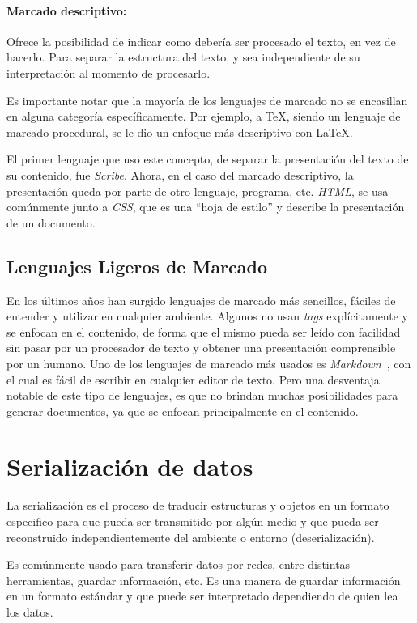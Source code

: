 \documentclass[12pt,letterpaper,titlepage,oneside,openright]{book}
\newcommand{\latex}{\LaTeX\xspace}
\newcommand{\tex}{\TeX\xspace}
\begin{document}
\paragraph{Marcado descriptivo:}

Ofrece la posibilidad de indicar como debería ser procesado el texto, en vez de hacerlo. Para separar la estructura del texto, y sea independiente de su interpretación al momento de procesarlo.

Es importante notar que la mayoría de los lenguajes de marcado no se encasillan en alguna categoría específicamente. Por ejemplo, a \tex, siendo un lenguaje de marcado procedural, se le dio un enfoque más descriptivo con \latex.

El primer lenguaje que uso este concepto, de separar la presentación del texto de su contenido, fue \textit{Scribe}. Ahora, en el caso del marcado descriptivo, la presentación queda por parte de otro lenguaje, programa, etc. \textit{HTML}, se usa comúnmente junto a \textit{CSS}, que es una ``hoja de estilo'' y describe la presentación de un documento.

\subsection{Lenguajes Ligeros de Marcado}

En los últimos años han surgido lenguajes de marcado más sencillos, fáciles de entender y utilizar en cualquier ambiente.  Algunos no usan \textit{tags} explícitamente y se enfocan en el contenido, de forma que el mismo pueda ser leído con facilidad sin pasar por un procesador de texto y obtener una presentación comprensible por un humano. Uno de los lenguajes de marcado más usados es \textit{Markdown}~\cite{webmarkdownhp}, con el cual es fácil de escribir en cualquier editor de texto. Pero una desventaja notable de este tipo de lenguajes, es que no brindan muchas posibilidades para generar documentos, ya que se enfocan principalmente en el contenido.

\section{Serialización de datos}

La serialización es el proceso de traducir estructuras y objetos en un formato especifico para que pueda ser transmitido por algún medio y que pueda ser reconstruido independientemente del ambiente o entorno (deserialización).

Es comúnmente usado para transferir datos por redes, entre distintas herramientas, guardar información, etc. Es una manera de guardar información en un formato estándar y que puede ser interpretado dependiendo de quien lea los datos.
\end{document}
